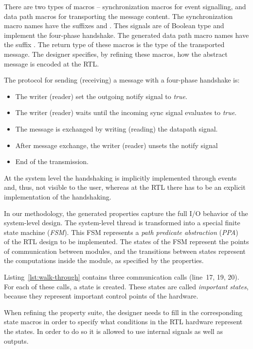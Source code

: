 {There are two types of macros -- synchronization macros for event signalling, and data path macros for transporting the message content. %
The synchronization macro names have the suffixes  and  . %
Thes signals are of Boolean type and implement the four-phase handshake. %
The generated data path macro names have the suffix . %
The return type of these macros is the type of the transported message. %
The designer specifies, by refining these macros, how the abstract message is encoded at the RTL. %

The protocol for sending (receiving) a message with a four-phase handshake is:
\begin{itemize}
\item The writer (reader) set the outgoing notify signal to
  \textit{true}. %
\item The writer (reader) waits until the incoming sync signal
  evaluates to \textit{true}. %
\item The message is exchanged by writing (reading) the datapath
  signal. %
\item After message exchange, the writer (reader) unsets the notify signal
\item End of the transmission. %
\end{itemize}

At the system level the handshaking is implicitly implemented through
events and, thus, not visible to the user, whereas at the RTL there
has to be an explicit implementation of the handshaking. %
 
In our methodology, the generated properties capture the full I/O
behavior of the system-level design. %
The system-level thread is transformed into a special finite state
machine (\textit{FSM}). 
This FSM represents a \emph{path predicate abstraction}
(\textit{PPA})~\cite{2015-UrdahlStoffel.etal, 2014-UrdahlStoffel.etal,
  2016-UrdahlUdupi.etal} of the RTL design to be implemented. %
The states of the FSM represent the points of communication between
modules, and the transitions between states represent the computations
inside the module, as specified by the properties. %

Listing~\ref{lst:walk-through} contains three communication calls (line~17, 19, 20). %
For each of these calls, a state is created. 
These states are called \textit{important states}, because they
represent important control points of the hardware. %

When refining the property suite, the designer needs to fill in the
corresponding state macros in order to specify what conditions in the
RTL hardware represent the states. %
In order to do so it is allowed to use internal signals as well as outputs. %

}
